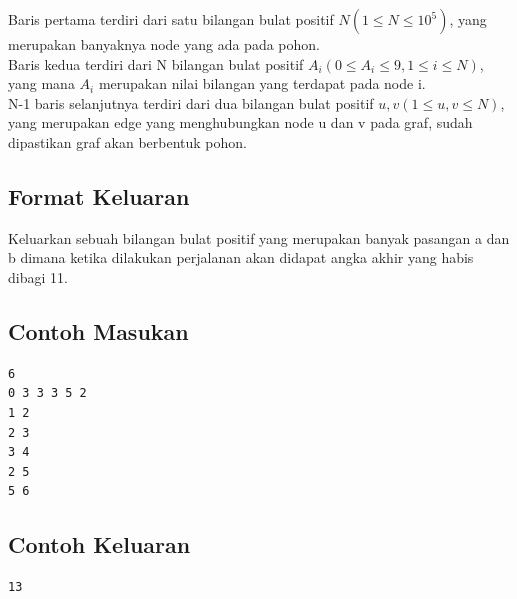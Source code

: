 \documentclass{article}
\begin{document}
Baris pertama terdiri dari satu bilangan bulat positif $N (1 \leq N \leq 10^5)$, yang merupakan banyaknya node yang ada pada pohon.\\

Baris kedua terdiri dari N bilangan bulat positif $A_{i} (0 \leq A_{i} \leq 9, 1 \leq i \leq N)$, yang mana $A_{i}$ merupakan nilai bilangan yang terdapat pada node i.\\

N-1 baris selanjutnya terdiri dari dua bilangan bulat positif $u, v (1 \leq u, v \leq N)$, yang merupakan edge yang menghubungkan node u dan v pada graf, sudah dipastikan graf akan berbentuk pohon.

\subsection*{Format Keluaran}

Keluarkan sebuah bilangan bulat positif yang merupakan banyak pasangan a dan b dimana ketika dilakukan perjalanan akan didapat angka akhir yang habis dibagi 11.

\begin{multicols}{2}
\subsection*{Contoh Masukan}
\begin{lstlisting}
6
0 3 3 3 5 2
1 2
2 3
3 4
2 5
5 6
\end{lstlisting}
\columnbreak
\subsection*{Contoh Keluaran}
\begin{lstlisting}
13
\end{lstlisting}
\vfill
\null
\end{multicols}
\end{document}
